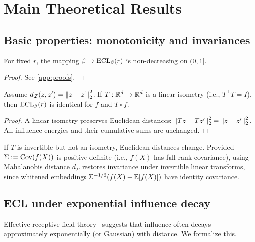 \section{Main Theoretical Results}\label{sec:theory}

\subsection{Basic properties: monotonicity and invariances}

\begin{proposition}\label{prop:mono_beta}
For fixed $r$, the mapping $\beta\mapsto \mathrm{ECL}_\beta(r)$ is non-decreasing on $(0,1]$.
\end{proposition}
\begin{proof}
See \cref{app:proofs}.
\end{proof}

\begin{proposition}\label{prop:isometry}
Assume $d_{\mathcal{Z}}(z,z')=\left\lVert z-z' \right\rVert_2^2$. If $T:\mathbb{R}^d\to\mathbb{R}^d$ is a linear isometry (i.e., $T^\top T = I$), then $\mathrm{ECL}_\beta(r)$ is identical for $f$ and $T\circ f$.
\end{proposition}
\begin{proof}
A linear isometry preserves Euclidean distances: $\left\lVert Tz-Tz' \right\rVert_2^2 = \left\lVert z-z' \right\rVert_2^2$. All influence energies and their cumulative sums are unchanged.
\end{proof}

\begin{remark}
If $T$ is invertible but not an isometry, Euclidean distances change. Provided $\Sigma := \operatorname{Cov}(f(X))$ is positive definite (i.e., $f(X)$ has full-rank covariance), using Mahalanobis distance $d_\Sigma$ restores invariance under invertible linear transforms, since whitened embeddings $\Sigma^{-1/2}(f(X)-\mathbb{E}[f(X)])$ have identity covariance.
\end{remark}

\subsection{ECL under exponential influence decay}\label{sec:exp_decay}

Effective receptive field theory~\citep{Luo2016EffectiveRF} suggests that influence often decays approximately exponentially (or Gaussian) with distance. We formalize this.

